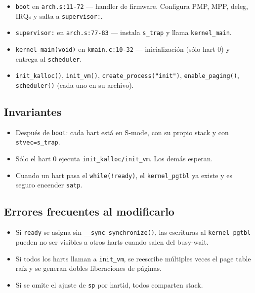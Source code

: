 \documentclass[11pt,a4paper]{article}
\begin{document}
\begin{itemize}[leftmargin=*]
    \item \texttt{boot} en \texttt{arch.s:11-72} — handler de
        firmware. Configura PMP, MPP, deleg, IRQs y salta a
        \texttt{supervisor:}.
    \item \texttt{supervisor:} en \texttt{arch.s:77-83} — instala
        \texttt{s\_trap} y llama \texttt{kernel\_main}.
    \item \texttt{kernel\_main(void)} en \texttt{kmain.c:10-32} —
        inicialización (sólo hart 0) y entrega al \texttt{scheduler}.
    \item \texttt{init\_kalloc()}, \texttt{init\_vm()},
        \texttt{create\_process("init")}, \texttt{enable\_paging()},
        \texttt{scheduler()} (cada uno en su archivo).
\end{itemize}

\subsection*{Invariantes}

\begin{itemize}[nosep,leftmargin=*]
    \item Después de \texttt{boot}: cada hart está en S-mode, con
        su propio stack y con \texttt{stvec=s\_trap}.
    \item Sólo el hart 0 ejecuta \texttt{init\_kalloc/init\_vm}.
        Los demás esperan.
    \item Cuando un hart pasa el \texttt{while(!ready)}, el
        \texttt{kernel\_pgtbl} ya existe y es seguro encender
        \texttt{satp}.
\end{itemize}

\subsection*{Errores frecuentes al modificarlo}

\begin{itemize}[nosep,leftmargin=*]
    \item Si \texttt{ready} se asigna sin \texttt{\_\_sync\_synchronize()},
        las escrituras al \texttt{kernel\_pgtbl} pueden no ser
        visibles a otros harts cuando salen del busy-wait.
    \item Si todos los harts llaman a \texttt{init\_vm}, se reescribe
        múltiples veces el page table raíz y se generan dobles
        liberaciones de páginas.
    \item Si se omite el ajuste de \texttt{sp} por hartid, todos
        comparten stack.
\end{itemize}
\end{document}
